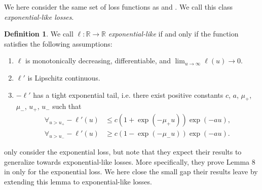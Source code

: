 \documentclass{article}
\theoremstyle{plain}
\theoremstyle{definition}
\newtheorem{definition}[theorem]{Definition}
\theoremstyle{remark}
\begin{document}
We here consider the same set of loss functions as \citet{soudry_implicit_2018} and \citet{lyu_gradient_2020}.
We call this class \emph{exponential-like losses}.

\begin{definition}
\label{def:exponential-like}
We call $\ell:\mathbb{R}\to\mathbb{R}$ \emph{exponential-like} if and only if the function satisfies the following assumptions:

\begin{enumerate}
    \item $\ell$ is monotonically decreasing, differentiable, and $\lim_{u\to\infty}\ell(u)\to0$.
    \item $\ell'$ is Lipschitz continuous.
    \item $-\ell'$ has a tight exponential tail, i.e. there exist positive constants $c$, $a$, $\mu_{+}$, $\mu_{-}$, $u_{+}$, $u_{-}$ such that
    \begin{align}
        \forall_{u>u_{+}}-\ell'(u)&\leq c(1+\exp(-\mu_{+}u))\exp(-au),\\
        \forall_{u>u_{-}}-\ell'(u)&\geq c(1-\exp(-\mu_{-}u))\exp(-au).
    \end{align}
\end{enumerate}
\end{definition}

\citet{gunasekar_characterizing_2018,gunasekar_implicit_2018} only consider the exponential loss, but note that they expect their results to generalize towards exponential-like losses.
More specifically, they prove Lemma 8 in \citet{gunasekar_characterizing_2018} only for the exponential loss.
We here close the small gap their results leave by extending this lemma to exponential-like losses.
\end{document}
